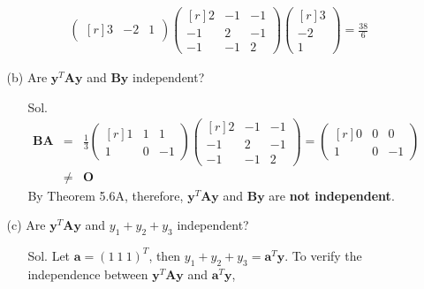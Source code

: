 \documentclass[12pt]{article} %
\begin{document}
\begin{enumerate}
\begin{enumerate}
\begin{enumerate}
\begin{eqnarray*}
		  \begin{pmatrix}[r]
		   3 & -2 & 1
		  \end{pmatrix}
		  \begin{pmatrix}[r]
			 2  & -1 & -1 \\
 			 -1 &  2 & -1  \\
			 -1 & -1 & 2 			
		  \end{pmatrix}
		  \begin{pmatrix}[r]
			 3 \\
		        -2 \\
			 1 		
		  \end{pmatrix}=\frac{38}{6}               
                  \end{eqnarray*}  
		\end{enumerate}
	  \item[(b)] Are $\mathbf{y}^{T}\mathbf{A}\mathbf{y}$ and $\mathbf{By}$ independent?
		\begin{enumerate}
		  \item[Sol.] 
		  \begin{eqnarray*}
			\mathbf{BA}&=&\frac{1}{3}
			\begin{pmatrix}[r]
		    	       1  & 1 & 1 \\
		               1 &  0 & -1 			   
			\end{pmatrix}
			\begin{pmatrix}[r]
			 2  & -1 & -1 \\
	 		 -1 &  2 & -1  \\
			 -1 & -1 & 2 				
			\end{pmatrix}=
			\begin{pmatrix}[r]
			   0  &  0  &  0 \\
			  1   &  0  & -1
			\end{pmatrix}\\
		        &\neq&
			\mathbf{O}
		  \end{eqnarray*}
		  By Theorem 5.6A, therefore, $\mathbf{y}^{T}\mathbf{A}\mathbf{y}$ and $\mathbf{By}$ 
		  are \textbf{not independent}.
		\end{enumerate}
	  \item[(c)] Are $\mathbf{y}^{T}\mathbf{A}\mathbf{y}$ and $y_{1}+y_{2}+y_{3}$ independent?
		\begin{enumerate}
		  \item[Sol.] Let $\mathbf{a}=(1~1~1)^{T}$, then $y_{1}+y_{2}+y_{3}=\mathbf{a}^{T}\mathbf{y}$.
		  To verify the independence between $\mathbf{y}^{T}\mathbf{A}\mathbf{y}$ and $\mathbf{a}^{T}\mathbf{y}$, 
		  \begin{eqnarray*}

\end{eqnarray*}
\end{enumerate}
\end{enumerate}
\end{enumerate}
\end{document}
